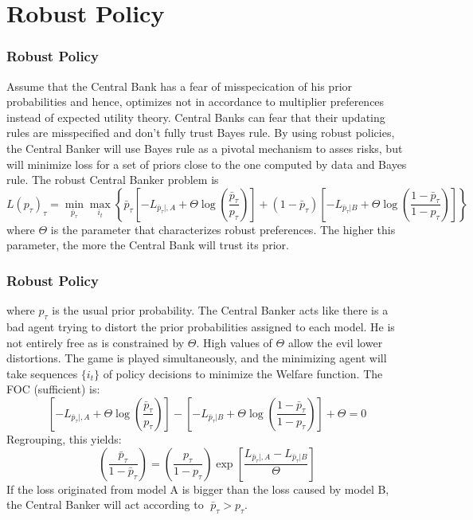 \documentclass{beamer}
\begin{document}
\section{Robust Policy}
\begin{frame} 
\frametitle{Robust Policy} 
Assume that the Central Bank has a fear of misspecication of his prior probabilities and
hence, optimizes not in accordance to multiplier preferences instead of expected utility
theory. Central Banks can fear that their updating rules are misspecified and
don't fully trust Bayes rule.
\newline
\newline
By using robust policies, the Central Banker will use Bayes rule as a pivotal
mechanism to asses risks, but will minimize loss for a set of priors close to the one
computed by data and Bayes rule. The robust Central Banker problem is
\scriptsize
\begin{equation}
L(p_\tau)_\tau = \min_{\bar{p}_\tau} \max_{i_t} \left \{ \bar{p}_\tau \left [ - L_{\bar{p}_\tau|,A} + \Theta \log \left ( \frac{\bar{p}_\tau}{p_\tau} \right ) \right ] + (1 - \bar{p}_\tau) \left [- L_{\bar{p}_\tau|B} + \Theta \log \left ( \frac{1 - \bar{p}_\tau}{1 - p_\tau} \right ) \right ] \right \}
\end{equation}
\normalsize
where $\Theta$ is the parameter that characterizes robust preferences. The
higher this parameter, the more the Central Bank will trust its prior.
\end{frame}

\begin{frame} 
\frametitle{Robust Policy} 
where $p_{\tau}$ is the usual prior probability. The Central Banker acts like
there is a bad agent trying to distort the prior probabilities assigned to each
model. He is not entirely free as is constrained by $\Theta$.  High values of $\Theta$
allow the evil lower distortions. The game is played simultaneously, and the
minimizing agent will take sequences $\{i_t\}$ of policy decisions to
minimize the Welfare function. The FOC (sufficient) is:
\begin{equation}
\left [ -L_{\bar{p}_\tau|,A} + \Theta \log \left ( \frac{\bar{p}_\tau}{p_\tau} \right ) \right ] - \left [ -L_{\bar{p}_\tau|B} + \Theta \log \left ( \frac{1-\bar{p}_\tau}{1-p_\tau} \right ) \right] + \Theta = 0
\end{equation}
Regrouping, this yields:
\begin{equation}
\left ( \frac{\bar{p}_\tau}{1-\bar{p}_\tau} \right ) = \left ( \frac{p_\tau}{1-p_\tau} \right ) \exp \left [ \frac{L_{\bar{p}_\tau|,A} - L_{\bar{p}_\tau|B} }{\Theta} \right ]
\end{equation}
If the loss originated from model A is bigger than the loss caused
by model B, the Central Banker will act according to $\bar{p}_{\tau} > p_{\tau}$.
\end{frame}
\end{document}
